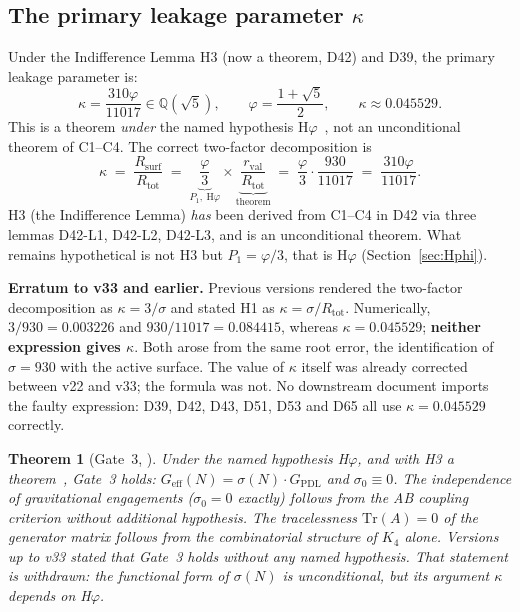 \documentclass[11pt,a4paper]{article}
\theoremstyle{plain}
\newtheorem{theorem}{Theorem}[section]
\theoremstyle{definition}
\theoremstyle{remark}
\newcommand{\Geff}{G_{\mathrm{eff}}}
\newcommand{\GPDL}{G_{\mathrm{PDL}}}
\newcommand{\rval}{r_{\mathrm{val}}}
\newcommand{\Rsurf}{R_{\mathrm{surf}}}
\newcommand{\Rtot}{R_{\mathrm{tot}}}
\newcommand{\sigmaN}{\sigma(N)}
\begin{document}
\subsection{The primary leakage parameter \texorpdfstring{$\kappa$}{kappa}}
\label{subsec:kappa}
Under the Indifference Lemma H3 (now a theorem, D42) and D39, the primary leakage parameter is:
\begin{equation}
\kappa = \frac{310\varphi}{11017} \in \mathbb{Q}(\sqrt{5}), \qquad \varphi = \frac{1+\sqrt{5}}{2}, \qquad \kappa \approx 0.045529.
\end{equation}
\textcolor{hypothesisorange}{This is a theorem \emph{under} the named hypothesis H$\varphi$}~\cite{D39,D42,D05}, not an unconditional theorem of C1--C4. The correct two-factor decomposition is
\begin{equation}
\kappa \;=\; \frac{\Rsurf}{\Rtot} \;=\; \underbrace{\frac{\varphi}{3}}_{P_1,\ \text{H}\varphi} \times \underbrace{\frac{\rval}{\Rtot}}_{\text{theorem}} \;=\; \frac{\varphi}{3}\cdot\frac{930}{11017} \;=\; \frac{310\varphi}{11017}.
\end{equation}
H3 (the Indifference Lemma) \emph{has} been derived from C1--C4 in D42 via three lemmas D42-L1, D42-L2, D42-L3, and is an unconditional theorem. What remains hypothetical is not H3 but $P_1=\varphi/3$, that is H$\varphi$ (Section~\ref{sec:Hphi}).

\textcolor{negativered}{\textbf{Erratum to v33 and earlier.}} Previous versions rendered the two-factor decomposition as $\kappa=3/\sigma$ and stated H1 as $\kappa=\sigma/\Rtot$. Numerically, $3/930=0.003226$ and $930/11017=0.084415$, whereas $\kappa=0.045529$; \textbf{neither expression gives $\kappa$}. Both arose from the same root error, the identification of $\sigma=930$ with the active surface. The value of $\kappa$ itself was already corrected between v22 and v33; the formula was not. No downstream document imports the faulty expression: D39, D42, D43, D51, D53 and D65 all use $\kappa=0.045529$ correctly.

\begin{theorem}[Gate~3, \cite{D36}]
\label{thm:Gate3}
\textcolor{hypothesisorange}{Under the named hypothesis H$\varphi$}, and with H3 a theorem~\cite{D42}, Gate~3 holds: $\Geff(N)=\sigmaN\cdot\GPDL$ and $\sigma_0\equiv 0$. The independence of gravitational engagements ($\sigma_0=0$ exactly) follows from the AB coupling criterion without additional hypothesis. The tracelessness $\mathrm{Tr}(A)=0$ of the generator matrix follows from the combinatorial structure of $K_4$ alone. \textcolor{negativered}{Versions up to v33 stated that Gate~3 holds \emph{without any named hypothesis}. That statement is withdrawn: the functional form of $\sigmaN$ is unconditional, but its argument $\kappa$ depends on H$\varphi$.}
\end{theorem}
\end{document}
